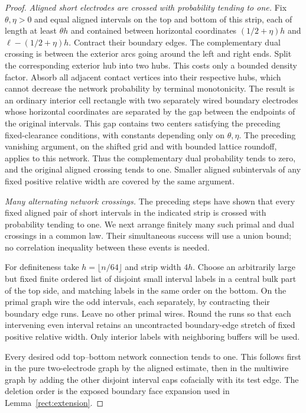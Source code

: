\begin{proof}
\smallskip\noindent
\emph{Aligned short electrodes are crossed with probability tending
to one.}
Fix $\theta,\eta>0$ and equal aligned intervals on the top and bottom
of this strip, each of length at least $\theta h$ and contained between
horizontal coordinates $(1/2+\eta)h$ and $\ell-(1/2+\eta)h$.
Contract their boundary edges.
The complementary dual crossing is between the exterior arcs going
around the left and right ends.  Split the corresponding exterior
hub into two hubs.  This costs only a bounded density factor.  Absorb
all adjacent contact vertices into their respective hubs, which cannot
decrease the network probability by terminal monotonicity. The result is an
ordinary interior cell rectangle with two separately wired boundary
electrodes whose horizontal coordinates are separated by the gap
between the endpoints of the original intervals. This gap contains
two centers satisfying the preceding fixed-clearance conditions, with
constants depending only on $\theta,\eta$. The preceding vanishing
argument, on the shifted grid and with bounded lattice roundoff,
applies to this network.  Thus the complementary dual probability
tends to zero, and the original aligned crossing tends to one.
Smaller aligned subintervals of any fixed positive relative width are
covered by the same argument.

\smallskip\noindent
\emph{Many alternating network crossings.}
The preceding steps have shown that every fixed aligned pair of short
intervals in the indicated strip is crossed with probability tending
to one. We next arrange finitely many such primal and dual crossings
in a common law. Their simultaneous success will use a union bound;
no correlation inequality between these events is needed.

For definiteness take $h=\lfloor n/64\rfloor$ and strip width $4h$.
Choose an arbitrarily large but fixed finite ordered list of disjoint
small interval labels in a central bulk part of the top side, and
matching labels in the same order on the bottom.  On the primal graph
wire the odd intervals, each separately, by contracting their boundary
edge runs.  Leave no other primal wires.  Round the runs so that each
intervening even interval retains an uncontracted boundary-edge stretch
of fixed positive relative width.  Only interior labels with neighboring
buffers will be used.

Every desired odd top--bottom network connection tends to one.  This
follows first in the pure two-electrode graph by the aligned estimate,
then in the multiwire graph by adding the other disjoint interval caps
cofacially with its test edge.  The deletion order is the exposed
boundary face expansion used in Lemma~\ref{rect:extension}.


\end{proof}
